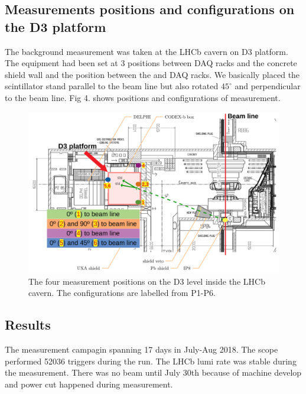 \subsection{Measurements positions and configurations on the D3 platform}

The background measurement was taken at the LHCb cavern on D3 platform. The equipment had been set at 3 positions between DAQ racks and the concrete shield wall and the position between the \delphi and DAQ racks.
We basically placed the scintillator stand parallel to the beam line but also rotated $45^{\circ}$ and perpendicular to the beam line.
Fig 4. shows positions and configurations of measurement.

\begin{figure}
\centering
    \includegraphics[width=16cm]{figs/INT/configuration.pdf}
\caption{
    The four measurement positions on the D3 level inside the LHCb cavern. The configurations are labelled from P1-P6.
}
\end{figure}

\subsection{Results}

The measurement campagin spanning 17 days in July-Aug 2018.
The scope performed 52036 triggers during the run.
The LHCb lumi rate was stable during the measurement.
There was no beam until July 30th because of machine develop and power cut happened during measurement.

